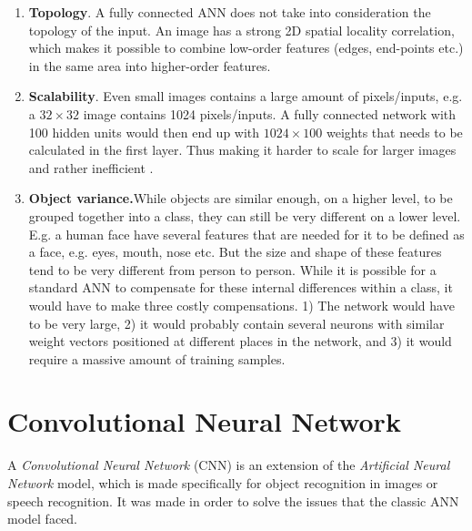 \begin{enumerate}

	\item \textbf{Topology}. A fully connected ANN does not take into consideration the topology of the input. An image has a strong 2D spatial locality correlation, which makes it possible to combine low-order features (edges, end-points etc.) in the same area into higher-order features.  
	
	\item \textbf{Scalability}. Even small images contains a large amount of pixels/inputs, e.g. a $ 32 \times 32 $ image contains 1024 pixels/inputs. A fully connected network with 100 hidden units would then end up with $ 1024 \times 100 $ weights that needs to be calculated in the first layer. Thus making it harder to scale for larger images and rather inefficient .
	
	\item \textbf{Object variance.}While objects are similar enough, on a higher level, to be grouped together into a class, they can still be very different on a lower level. E.g. a human face have several features that are needed for it to be defined as a face, e.g. eyes, mouth, nose etc. But the size and shape of these features tend to be very different from person to person. While it is possible for a standard ANN to compensate for these internal differences within a class, it would have to make three costly compensations. 1) The network would have to be very large, 2) it would probably contain several neurons with similar weight vectors positioned at different places in the network, and 3)  it would require a massive amount of training samples. 
	
\end{enumerate}



\section{Convolutional Neural Network}\label{cnn}

A \textit{Convolutional Neural Network} \cite{LeCun1998} (CNN) is an extension of the \textit{Artificial Neural Network} model, which is made specifically for object recognition in images or speech recognition. It was made in order to solve the issues that the classic ANN model faced. 


